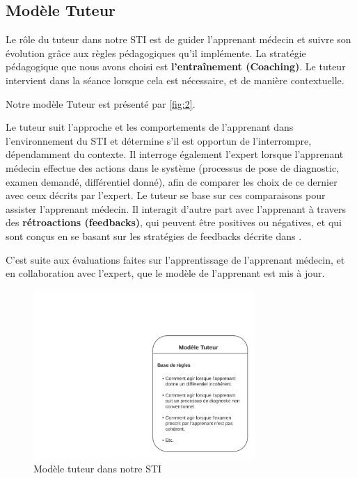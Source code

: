     \subsection{Modèle Tuteur}

Le rôle du tuteur dans notre STI est de guider l'apprenant médecin et suivre son évolution grâce aux règles pédagogiques qu'il implémente. La stratégie pédagogique que nous avons choisi est \textbf{l'entraînement (Coaching)}. Le tuteur intervient dans la séance lorsque cela est nécessaire, et de manière contextuelle.

Notre modèle Tuteur est présenté par \autoref{fig:2}.

Le tuteur suit l'approche et les comportements de l'apprenant dans l'environnement du STI et détermine s'il est opportun de l'interrompre, dépendamment du contexte. Il interroge également l'expert lorsque l'apprenant médecin effectue des actions dans le système (processus de pose de diagnostic, examen demandé, différentiel donné), afin de comparer les choix de ce dernier avec ceux décrits par l'expert. Le tuteur se base sur ces comparaisons pour assister l'apprenant médecin. Il interagit d'autre part avec l'apprenant à travers des \textbf{rétroactions (feedbacks)}, qui peuvent être positives ou négatives, et qui sont conçus en se basant sur les stratégies de feedbacks décrite dans \cite{narciss2008feedback}.

C'est suite aux évaluations faites sur l'apprentissage de l'apprenant médecin, et en collaboration avec l'expert, que le modèle de l'apprenant est mis à jour.
 \newpage
 
\begin{figure}
    \includegraphics[width=0.75\textwidth]{figures/mod_tuteur.png}
    \captionsetup{justification=centering}
    \caption{Modèle tuteur dans notre STI}
 \label{fig:2}
\end{figure}

